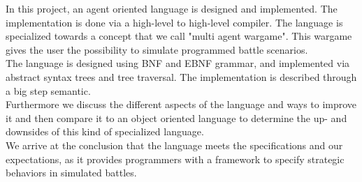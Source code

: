 In this project, an agent oriented language is designed and implemented. The implementation is done via a high-level to high-level compiler. The language is specialized towards a concept that we call "multi agent wargame". This wargame gives the user the possibility to simulate programmed battle scenarios.\\ \indent
The language is designed using BNF and EBNF grammar, and implemented via abstract syntax trees and tree traversal. The implementation is described through a big step semantic.\\ 
\indent Furthermore we discuss the different aspects of the language and ways to improve it and then compare it to an object oriented language to determine the up- and downsides of this kind of specialized language.\\ 
\indent We arrive at the conclusion that the language meets the specifications
and our expectations, as it provides programmers with a framework to
specify strategic behaviors in simulated battles.
